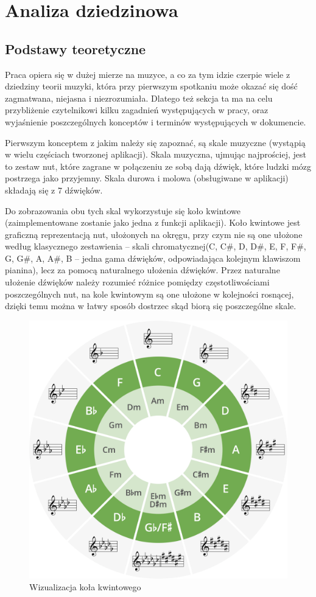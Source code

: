\chapter{Analiza dziedzinowa}
\section{Podstawy teoretyczne}
Praca opiera się w dużej mierze na muzyce, a co za tym idzie czerpie wiele z dziedziny teorii muzyki, która przy pierwszym spotkaniu może okazać się dość zagmatwana, niejasna i niezrozumiała. Dlatego też sekcja ta ma na celu przybliżenie czytelnikowi kilku zagadnień występujących w pracy, oraz wyjaśnienie poszczególnych konceptów i terminów występujących w dokumencie. 

Pierwszym konceptem z jakim należy się zapoznać, są skale muzyczne (wystąpią w wielu częściach tworzonej aplikacji). Skala muzyczna, ujmując najprościej, jest to zestaw nut, które zagrane w połączeniu ze sobą dają dźwięk, które ludzki mózg postrzega jako przyjemny. 
Skala durowa i molowa (obsługiwane w aplikacji) składają się z 7 dźwięków. 

Do zobrazowania obu tych skal wykorzystuje się koło kwintowe (zaimplementowane zostanie jako jedna z funkcji aplikacji). Koło kwintowe jest graficzną reprezentacją nut, ułożonych na okręgu, przy czym nie są one ułożone według klasycznego zestawienia -- skali chromatycznej(C, C\#, D, D\#, E, F, F\#, G, G\#, A, A\#, B -- jedna gama dźwięków, odpowiadająca kolejnym klawiszom pianina), lecz za pomocą naturalnego ułożenia dźwięków. Przez naturalne ułożenie dźwięków należy rozumieć różnice pomiędzy częstotliwościami poszczególnych nut, na kole kwintowym są one ułożone w kolejności rosnącej, dzięki temu można w łatwy sposób dostrzec skąd biorą się poszczególne skale. 

\begin{figure}[htb]
	\centering
	\includegraphics[width=.3\linewidth]{rys02/cof2.1}
	\caption{Wizualizacja koła kwintowego} \label{fig:pageLayout}
\end{figure}

